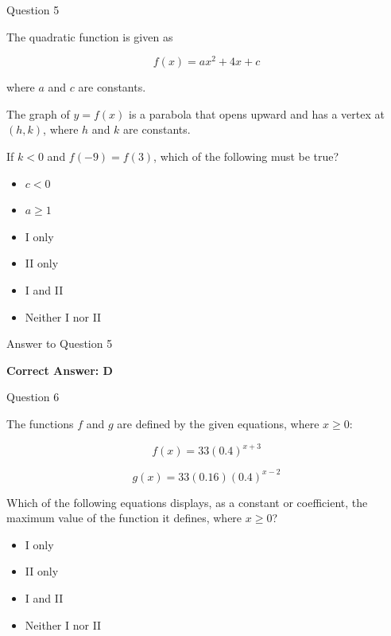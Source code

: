 \documentclass{beamer}
\begin{document}
\begin{frame}{Question 5}

The quadratic function is given as

\[
f(x)=ax^2+4x+c
\]

where $a$ and $c$ are constants.

The graph of $y=f(x)$ is a parabola that opens upward and has a vertex at $(h,k)$, where $h$ and $k$ are constants.

If $k<0$ and $f(-9)=f(3)$, which of the following must be true?

\begin{itemize}
    \item[I.] $c<0$
    \item[II.] $a\ge 1$
\end{itemize}

\begin{itemize}
    \item[A.] I only
    \item[B.] II only
    \item[C.] I and II
    \item[D.] Neither I nor II
\end{itemize}

\end{frame}

\begin{frame}{Answer to Question 5}

\textbf{Correct Answer: D}

\end{frame}


\begin{frame}{Question 6}

The functions $f$ and $g$ are defined by the given equations, where $x\ge0$:

\[
f(x)=33(0.4)^{x+3}
\]

\[
g(x)=33(0.16)(0.4)^{x-2}
\]

Which of the following equations displays, as a constant or coefficient, the maximum value of the function it defines, where $x\ge0$?

\begin{itemize}
    \item[A.] I only
    \item[B.] II only
    \item[C.] I and II
    \item[D.] Neither I nor II
\end{itemize}

\end{frame}
\end{document}
